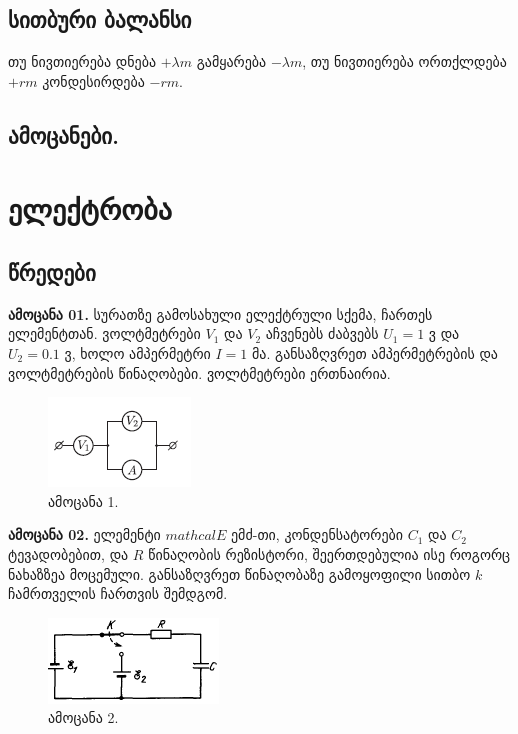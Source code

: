 \documentclass[a4paper]{book}
\begin{document}
\section{სითბური ბალანსი}
თუ ნივთიერება დნება $+\lambda m$ გამყარება $-\lambda m$, თუ ნივთიერება ორთქლდება $+r m$ კონდესირდება $-rm$.
\section{ამოცანები.}

\chapter{ელექტრობა}

\section{წრედები}
\textbf{ამოცანა 01.} სურათზე გამოსახული ელექტრული სქემა, ჩართეს ელემენტთან. ვოლტმეტრები $V_1$ და $V_2$ აჩვენებს ძაბვებს $U_1 = 1$ ვ და $U_2 = 0.1$ ვ, ხოლო ამპერმეტრი $I = 1$ მა. განსაზღვრეთ ამპერმეტრების და ვოლტმეტრების წინაღობები. ვოლტმეტრები ერთნაირია.
	\begin{figure}[H]
		\centering
		\includegraphics[width=0.3\columnwidth]{figures/phys852}
		\caption{ამოცანა 1.}
		\label{fig:phys852}
	\end{figure}
\textbf{ამოცანა 02.} ელემენტი $mathcal{E}$ ემძ-თი, კონდენსატორები $C_1$ და $C_2$ ტევადობებით, და $R$ წინაღობის რეზისტორი, შეერთდებულია ისე როგორც ნახაზზეა მოცემული. განსაზღვრეთ წინაღობაზე გამოყოფილი სითბო $k$ ჩამრთველის ჩართვის შემდგომ.
	\begin{figure}[H]
		\centering
		\includegraphics[width=0.3\columnwidth]{figures/phys694}
		\caption{ამოცანა 2.}
		\label{fig:phys694}
	\end{figure}
\end{document}

